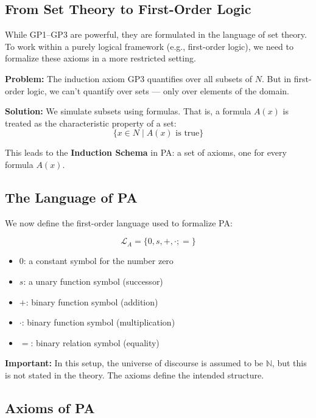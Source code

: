\documentclass[12pt]{article}
\begin{document}
\subsection{From Set Theory to First-Order Logic}

While GP1–GP3 are powerful, they are formulated in the language of set theory. To work within a purely logical framework (e.g., first-order logic), we need to formalize these axioms in a more restricted setting.

\textbf{Problem:} The induction axiom GP3 quantifies over all subsets of \( N \). But in first-order logic, we can’t quantify over sets — only over elements of the domain.

\textbf{Solution:} We simulate subsets using formulas. That is, a formula \( A(x) \) is treated as the characteristic property of a set:
\[
\{ x \in N \mid A(x) \text{ is true} \}
\]

This leads to the \textbf{Induction Schema} in PA: a set of axioms, one for every formula \( A(x) \).

\subsection{The Language of PA}

We now define the first-order language used to formalize PA:

\[
\mathcal{L}_A = \{ 0, s, +, \cdot; = \}
\]

\begin{itemize}
  \item \( 0 \): a constant symbol for the number zero
  \item \( s \): a unary function symbol (successor)
  \item \( + \): binary function symbol (addition)
  \item \( \cdot \): binary function symbol (multiplication)
  \item \( = \): binary relation symbol (equality)
\end{itemize}

\vspace{1em}
\textbf{Important:} In this setup, the universe of discourse is assumed to be \( \mathbb{N} \), but this is not stated in the theory. The axioms define the intended structure.

\subsection{Axioms of PA}
\end{document}

